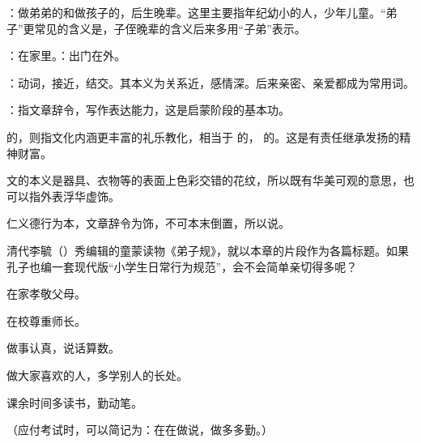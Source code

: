 {
\item {}：做弟弟的和做孩子的，后生晚辈。这里主要指年纪幼小的人，少年儿童。“弟子”更常见的含义是，子侄晚辈的含义后来多用“子弟”表示。
\item {}：在家里。：出门在外。
\item {}：动词，接近，结交。其本义为关系近，感情深。后来亲密、亲爱都成为常用词。
\item {}：指文章辞令，写作表达能力，这是启蒙阶段的基本功。

 的，则指文化内涵更丰富的礼乐教化，相当于  的， 的。这是有责任继承发扬的精神财富。

文的本义是器具、衣物等的表面上色彩交错的花纹，所以既有华美可观的意思，也可以指外表浮华虚饰。

\item 仁义德行为本，文章辞令为饰，不可本末倒置，所以说。
}
{
清代李毓（）秀编辑的童蒙读物《弟子规》，就以本章的片段作为各篇标题。如果孔子也编一套现代版“小学生日常行为规范”，会不会简单亲切得多呢？
\begin{lyenumerate}
\item 在家孝敬父母。
\item 在校尊重师长。%
\item 做事认真，说话算数。
\item 做大家喜欢的人，多学别人的长处。
\item 课余时间多读书，勤动笔。
\end{lyenumerate}
（应付考试时，可以简记为：在在做说，做多多勤。）
}


